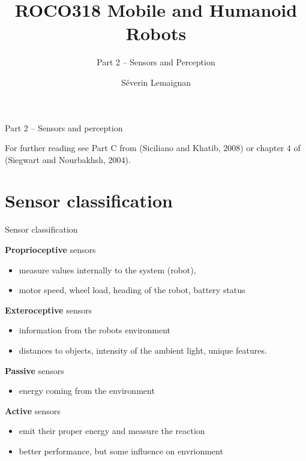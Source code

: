 \documentclass[compress]{beamer}
\title{ROCO318 \newline Mobile and Humanoid Robots}
\subtitle{Part 2 -- Sensors and Perception}
\date{}
\author{Séverin Lemaignan}
\institute{Centre for Neural Systems and Robotics\\{\bf Plymouth University}}
\begin{document}

\maketitle

\begin{frame}{Part 2 -- Sensors and perception}

For further reading see Part C from (Siciliano and Khatib, 2008) or
chapter 4 of (Siegwart and Nourbakhsh, 2004).

\end{frame}

\section{Sensor classification}\label{sensor-classification}

\begin{frame}{Sensor classification}

\textbf{Proprioceptive} sensors

\begin{itemize}

\item
  measure values internally to the system (robot),
\item
  \eg motor speed, wheel load, heading of the robot, battery status
\end{itemize}

\textbf{Exteroceptive} sensors

\begin{itemize}

\item
  information from the robots environment
\item
  distances to objects, intensity of the ambient light, unique features.
\end{itemize}

\textbf{Passive} sensors

\begin{itemize}

\item
  energy coming from the environment
\end{itemize}

\textbf{Active} sensors

\begin{itemize}

\item
  emit their proper energy and measure the reaction
\item
  better performance, but some influence on envrionment
\end{itemize}

\end{frame}
\end{document}
